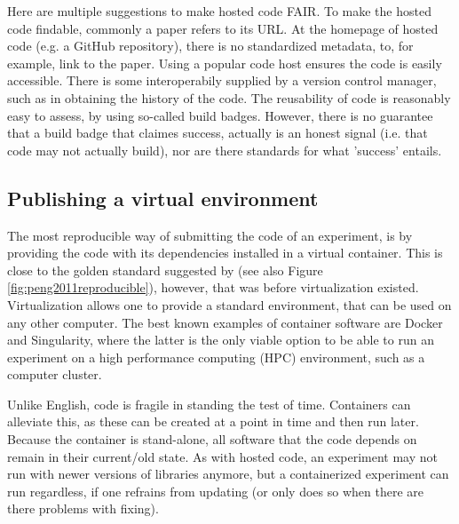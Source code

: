 
Here are multiple suggestions to make hosted code FAIR.
To make the hosted code findable, commonly a paper refers to its URL.
At the homepage of hosted code (e.g. a GitHub repository), 
there is no standardized metadata, to,
for example, link to the paper.
Using a popular code host ensures the code is easily accessible.
There is some interoperabily supplied by a version control manager,
such as in obtaining the history of the code.
The reusability of code is reasonably easy to assess, 
by using so-called build badges.
However, there is no guarantee that a build badge that claimes success,
actually is an honest signal (i.e. that code may not actually build),
nor are there standards for what 'success' entails.

\subsection{Publishing a virtual environment}

The most reproducible way of submitting the code of an experiment,
is by providing the code with its dependencies installed in a virtual container.
This is close to the golden standard suggested by 
\cite{peng2011reproducible} (see also Figure \ref{fig:peng2011reproducible}),
however, that was before virtualization existed.
Virtualization allows one to provide a standard environment,
that can be used on any other computer.
The best known examples of container software are Docker and Singularity,
where the latter is the only viable option to be able to run
an experiment on a high performance computing (HPC) environment,
such as a computer cluster.


Unlike English, code is fragile in standing the test of time.
Containers can alleviate this, as these can be created at a point
in time and then run later. Because the container is stand-alone,
all software that the code depends on remain in their current/old state.
As with hosted code, an experiment may not run with newer versions
of libraries anymore, but a containerized experiment can run regardless, 
if one refrains from updating (or only does so when there are there problems with fixing).

